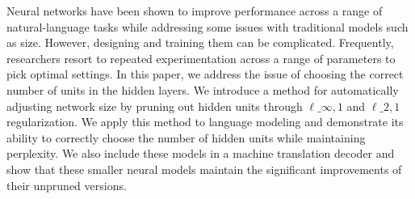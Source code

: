 Neural networks have been shown to improve performance across a range of natural-language tasks while addressing some issues with traditional models such as size. However, designing and training them can be complicated. Frequently, researchers resort to repeated experimentation across a range of parameters to pick optimal settings. In this paper, we address the issue of choosing the correct number of units in the hidden layers. We introduce a method for automatically adjusting network size by pruning out hidden units through $\ell\_{\infty,1}$ and $\ell\_{2,1}$ regularization. We apply this method to language modeling and demonstrate its ability to correctly choose the number of hidden units while maintaining perplexity. We also include these models in a machine translation decoder and show that these smaller neural models maintain the significant improvements of their unpruned versions.
